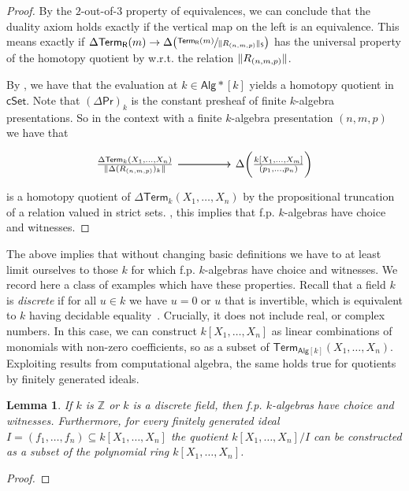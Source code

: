 \documentclass[10pt,a4paper]{article}
\newtheorem{lemma}{Lemma}[section]
\newcommand{\ints}{\mathbb{Z}}
\newcommand{\cSet}{\mathsf{cSet}}
\newcommand{\Alg}{\mathsf{Alg}}
\DeclarePairedDelimiter\paren{(}{)}
\newcommand\R{\mathsf{R}}
\renewcommand\Pr{\mathsf{Pr}}
\newcommand\Term{\mathsf{Term}}
\begin{document}
\begin{proof}
  By the \(2\)-out-of-\(3\) property of equivalences, we can conclude that the duality axiom holds exactly if the vertical map on the left is an equivalence.
  This means exactly if \(\Delta\Term_{\R}(m) \to \Delta\paren[\big]{\sfrac{\Term_{\R}(m)}{\trunc*{R_{(n,m,p)}}}}\) has the universal property of the homotopy quotient by w.r.t. the relation \(\trunc{R_{(n,m,p)}}\).

  By , we have that the evaluation at \(k \in \Alg*[k]\) yields a homotopy quotient in \(\cSet\). 
  Note that \((\Delta \Pr)_k\) is the constant presheaf of finite \(k\)-algebra presentations.
  So in the context with a finite \(k\)-algebra presentation \((n, m, p)\) we have that 
  \[\begin{tikzcd}
    {\frac{\Delta \Term_k(X_1, \ldots, X_n)}{\trunc{\Delta (R_{(n,m,p)})_k}}} && {\Delta\paren[\bigg]{\frac{k[X_1, \ldots, X_m]}{(p_1, \ldots, p_n)}}}
    \arrow[from=1-1, to=1-3]
    \arrow[from=1-1, to=1-3]
  \end{tikzcd}\]
  is a homotopy quotient of \(\Delta \Term_k(X_1, \ldots, X_n)\) by the propositional truncation of a relation valued in strict sets.
  , this implies that f.p. \(k\)-algebras have choice and witnesses.
\end{proof}

The above implies that without changing basic definitions we have to at least limit ourselves to those \(k\) for which f.p. \(k\)-algebras have choice and witnesses.
We record here a class of examples which have these properties.
Recall that a field $k$ is \emph{discrete} if for all $u \in k$ we have $u = 0$ or $u$ that is invertible, which is equivalent to $k$ having decidable equality~\cite{mines}.
Crucially, it does not include real, or complex numbers.
In this case, we can construct $k[X_1, \ldots, X_n]$ as linear combinations of monomials with non-zero coefficients, so as a subset of $\Term_{\Alg[k]}(X_1, \ldots, X_n)$.
Exploiting results from computational algebra, the same holds true for quotients by finitely generated ideals.

\begin{lemma}
  If $k$ is $\ints$ or $k$ is a discrete field, then f.p. \(k\)-algebras have choice and witnesses.
  Furthermore, for every finitely generated ideal $I = (f_1, \ldots, f_n) \subseteq k[X_1, \ldots, X_n]$ the quotient $k[X_1,\ldots,X_n]/I$ can be constructed as a subset of the polynomial ring $k[X_1, \ldots, X_n]$.
\end{lemma}
\begin{proof}
\end{proof}
\end{document}
